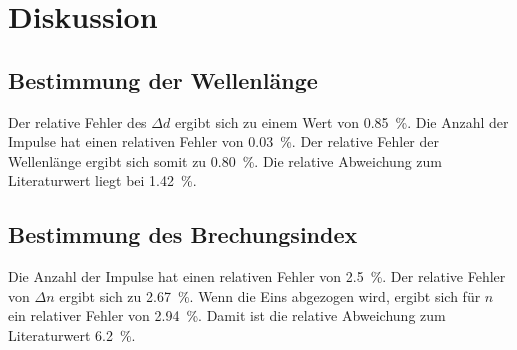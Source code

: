 \section{Diskussion}
\label{sec:Diskussion}

\subsection{Bestimmung der Wellenlänge}
Der relative Fehler des $\Delta d$ ergibt sich zu einem Wert von \SI{0.85}{\percent}. 
\newline
Die Anzahl der Impulse hat einen relativen Fehler von \SI{0.03}{\percent}. 
\newline
Der relative Fehler der Wellenlänge ergibt sich somit zu \SI{0.80}{\percent}. 
\newline
Die relative Abweichung zum Literaturwert liegt bei 
\SI{1.42}{\percent}.

\subsection{Bestimmung des Brechungsindex}
Die Anzahl der Impulse hat einen relativen Fehler von \SI{2.5}{\percent}. 
\newline
Der relative Fehler von $\Delta n$ ergibt sich zu \SI{2.67}{\percent}.
\newline
Wenn die Eins abgezogen wird, ergibt sich für $n$ ein relativer Fehler von \SI{2.94}{\percent}. Damit ist die relative Abweichung zum Literaturwert \SI{6.2}{\percent}. 

